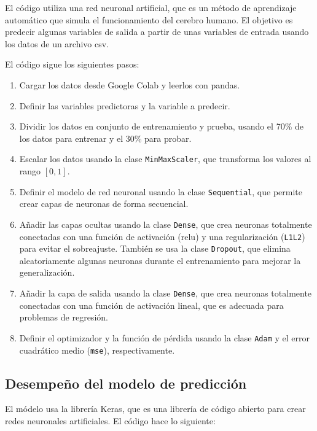 \documentclass{article}
\begin{document}
El código utiliza una red neuronal artificial, que es un método de aprendizaje automático que simula el funcionamiento del cerebro humano. El objetivo es predecir algunas variables de salida a partir de unas variables de entrada  usando los datos de un archivo csv.

El código sigue los siguientes pasos:

\begin{enumerate}
\item Cargar los datos desde Google Colab y leerlos con pandas.
\item Definir las variables predictoras y la variable a predecir.
\item Dividir los datos en conjunto de entrenamiento y prueba, usando el 70\% de los datos para entrenar y el 30\% para probar.
\item Escalar los datos usando la clase \lstinline{MinMaxScaler}, que transforma los valores al rango $[0, 1]$.
\item Definir el modelo de red neuronal usando la clase \lstinline{Sequential}, que permite crear capas de neuronas de forma secuencial.
\item Añadir las capas ocultas usando la clase \lstinline{Dense}, que crea neuronas totalmente conectadas con una función de activación ($\text{relu}$) y una regularización (\lstinline{L1L2}) para evitar el sobreajuste. También se usa la clase \lstinline{Dropout}, que elimina aleatoriamente algunas neuronas durante el entrenamiento para mejorar la generalización.
\item Añadir la capa de salida usando la clase \lstinline{Dense}, que crea neuronas totalmente conectadas con una función de activación lineal, que es adecuada para problemas de regresión.
\item Definir el optimizador y la función de pérdida usando la clase \lstinline{Adam} y el error cuadrático medio (\lstinline{mse}), respectivamente.
\end{enumerate}

\subsection{Desempeño del modelo de predicción}

El módelo usa la librería Keras, que es una librería de código abierto para crear redes neuronales artificiales. El código hace lo siguiente:
\end{document}
